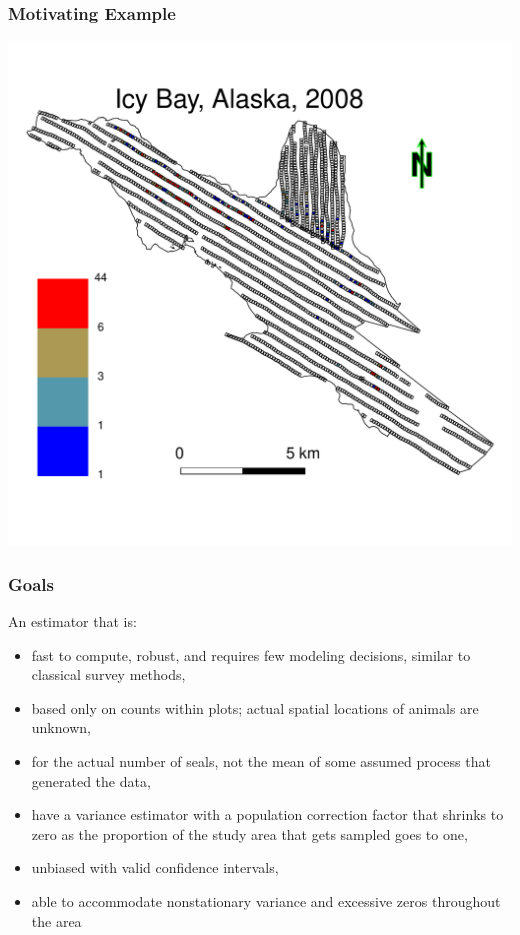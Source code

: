 \documentclass[mathserif,compress]{beamer}\usepackage{graphicx, color}
\makeatletter
\def\maxwidth{ %
  \ifdim\Gin@nat@width>\linewidth
    \linewidth
  \else
    \Gin@nat@width
  \fi
}
\makeatother
\begin{document}
\begin{frame}[fragile]
\frametitle{Motivating Example}




\vspace{-1cm}
\begin{center}
	\includegraphics[width = .8\maxwidth]{figure/icyBayIntro-plot} 
\end{center}

\end{frame}


\begin{frame}[fragile]
\frametitle{Goals}

\footnotesize
	An estimator that is:
		\begin{itemize}
		\item fast to compute, robust, and requires few modeling decisions, similar to classical survey methods, 			\item based only on counts within plots; actual spatial locations of animals are unknown, 
		\item for the actual number of seals, not the mean of some assumed process that generated the data, 
		\item have a variance estimator with a population correction factor that shrinks to zero as the proportion of the study area that gets sampled goes to one, 
		\item unbiased with valid confidence intervals, 
		\item able to accommodate nonstationary variance and excessive zeros throughout the area
		\end{itemize}

\end{frame}
\end{document}
